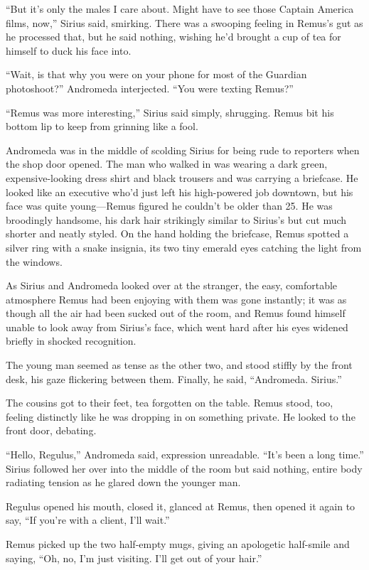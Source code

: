 “But it’s only the males I care about. Might have to see those Captain America films, now,” Sirius said, smirking. There was a swooping feeling in Remus’s gut as he processed that, but he said nothing, wishing he’d brought a cup of tea for himself to duck his face into.

“Wait, is that why you were on your phone for most of the Guardian photoshoot?” Andromeda interjected. “You were texting Remus?”

“Remus was more interesting,” Sirius said simply, shrugging. Remus bit his bottom lip to keep from grinning like a fool.

Andromeda was in the middle of scolding Sirius for being rude to reporters when the shop door opened. The man who walked in was wearing a dark green, expensive-looking dress shirt and black trousers and was carrying a briefcase. He looked like an executive who’d just left his high-powered job downtown, but his face was quite young—Remus figured he couldn’t be older than 25. He was broodingly handsome, his dark hair strikingly similar to Sirius’s but cut much shorter and neatly styled. On the hand holding the briefcase, Remus spotted a silver ring with a snake insignia, its two tiny emerald eyes catching the light from the windows.

As Sirius and Andromeda looked over at the stranger, the easy, comfortable atmosphere Remus had been enjoying with them was gone instantly; it was as though all the air had been sucked out of the room, and Remus found himself unable to look away from Sirius’s face, which went hard after his eyes widened briefly in shocked recognition.

The young man seemed as tense as the other two, and stood stiffly by the front desk, his gaze flickering between them. Finally, he said, “Andromeda. Sirius.”

The cousins got to their feet, tea forgotten on the table. Remus stood, too, feeling distinctly like he was dropping in on something private. He looked to the front door, debating.

“Hello, Regulus,” Andromeda said, expression unreadable. “It’s been a long time.” Sirius followed her over into the middle of the room but said nothing, entire body radiating tension as he glared down the younger man.

Regulus opened his mouth, closed it, glanced at Remus, then opened it again to say, “If you’re with a client, I’ll wait.”

Remus picked up the two half-empty mugs, giving an apologetic half-smile and saying, “Oh, no, I’m just visiting. I’ll get out of your hair.”

